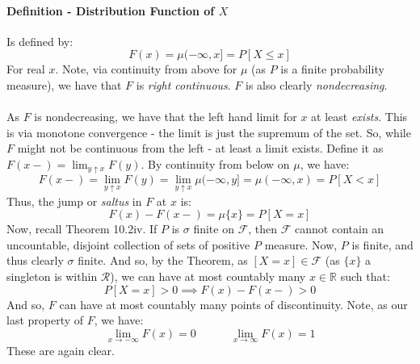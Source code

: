 \documentclass[12pt,a4paper]{article}
\newcommand{\1}[1]{\mathbbm{1}\left\{ #1 \right\}}
\newcommand{\R}{\mathbb{R}}
\newcommand{\fcal}{\mathcal{F}}
\newcommand{\rcal}{\mathcal{R}}
\begin{document}
\paragraph{Definition - Distribution Function of $X$} Is defined by:
$$
	F(x) = \mu(-\infty,x] = P\left[X \leq x\right]
$$
For real $x$. Note, via continuity from above for $\mu$ (as $P$ is a finite probability measure), we have that $F$ is \textit{right continuous}. $F$ is also clearly \textit{nondecreasing}. 
\\\\
As $F$ is nondecreasing, we have that the left hand limit for $x$ at least \textit{exists}. This is via monotone convergence - the limit is just the supremum of the set. So, while $F$ might not be continuous from the left - at least a limit exists. Define it as $F(x-) = \lim_{y \uparrow x} F(y)$. By continuity from below on $\mu$, we have:
$$
	F(x-) = \lim_{y \uparrow x} F(y) = \lim_{y \uparrow x} \mu(-\infty,y] = \mu(-\infty,x) = P[X < x] 
$$
Thus, the jump or \textit{saltus} in $F$ at $x$ is:
$$
	F(x) - F(x-) = \mu\{x\} = P[X = x]
$$
Now, recall Theorem 10.2iv. If $P$ is $\sigma$ finite on $\fcal$, then $\fcal$ cannot contain an uncountable, disjoint collection of sets of positive $P$ measure. Now, $P$ is finite, and thus clearly $\sigma$ finite. And so, by the Theorem, as $[X = x] \in \fcal$ (as $\{x\}$ a singleton is within $\rcal$), we can have at most countably many $x \in \R$ such that:
$$
	P[X = x] > 0 \implies F(x) - F(x-) > 0
$$
And so, $F$ can have at most countably many points of discontinuity. Note, as our last property of $F$, we have:
$$
	\lim_{x \to -\infty} F(x) = 0 \quad\quad\quad
	\lim_{x \to \infty} F(x) = 1
$$
These are again clear.
\end{document}
